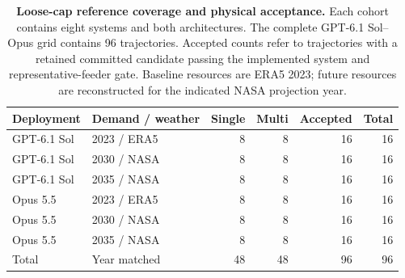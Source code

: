 \documentclass[pdflatex,sn-nature]{sn-jnl}
\begin{document}
\begin{appendices}
\begin{table}[htp]
\caption{\textbf{Loose-cap reference coverage and physical acceptance.} Each cohort contains eight systems and both architectures. The complete GPT-6.1 Sol--Opus grid contains 96 trajectories. Accepted counts refer to trajectories with a retained committed candidate passing the implemented system and representative-feeder gate. Baseline resources are ERA5 2023; future resources are reconstructed for the indicated NASA projection year.}
\label{tab:complete-coverage}
\centering\small
\begin{tabular}{@{}llrrrr@{}}
\toprule
Deployment & Demand / weather & Single & Multi & Accepted & Total \\
\midrule
GPT-6.1 Sol & 2023 / ERA5 & 8 & 8 & 16 & 16 \\
GPT-6.1 Sol & 2030 / NASA & 8 & 8 & 16 & 16 \\
GPT-6.1 Sol & 2035 / NASA & 8 & 8 & 16 & 16 \\
Opus 5.5 & 2023 / ERA5 & 8 & 8 & 16 & 16 \\
Opus 5.5 & 2030 / NASA & 8 & 8 & 16 & 16 \\
Opus 5.5 & 2035 / NASA & 8 & 8 & 16 & 16 \\
\midrule
Total & Year matched & 48 & 48 & 96 & 96 \\
\bottomrule
\end{tabular}
\end{table}
\begin{tableorg}[p]
\caption{\textbf{Selected planning outcomes for all 96 loose-cap reference trajectories.} Entries are total annual power-system costs in billion USD per year, including annualized representative-feeder interventions, rounded to three decimals. S and M denote single- and multi-agent architectures. The Accepted column counts retained physically accepted trajectories within each system--deployment row. Full numerical precision, candidate-specific solver bounds and evaluation effort are retained in Appendix~\ref{app:outcomes}.}
\label{tab:all-selected-costs}
\centering\small
{}
\end{tableorg}
\end{appendices}
\end{document}
